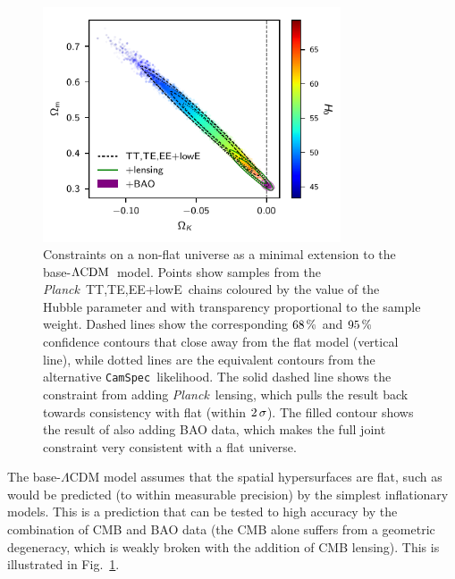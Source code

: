 \documentclass[longauth,traditabstract]{aa}
\def\Planck{\textit{Planck}}
\def\,{\thinspace}
\newcommand{\camspec}{{\tt CamSpec}}
\newcommand{\mksym}[1]{\ifmmode {\rm #1}\else #1\fi}
\newcommand{\dataplus}{\allowbreak+}
\newcommand{\TTTEEE}{\mksym{TT,TE,EE}}
\newcommand{\planckTTTEEEonly}{\planck\ \TTTEEE}
\newcommand{\lowE}{\mksym{lowE}}
\newcommand{\planckall}{\planckTTTEEEonly\dataplus\lowE}
\newcommand{\lcdm}{\texorpdfstring{{$\rm{\Lambda CDM}$}}{ΛCDM}}
\newcommand{\planck}{\Planck}
\begin{document}
\begin{figure}[t]
\centering
\includegraphics[width=88mm]{omegak-omegam.pdf}
\caption {
Constraints on a non-flat universe as a minimal extension to the base-\lcdm\ model.
Points show samples from the \planckall\ chains coloured by the value of the Hubble parameter and with transparency proportional to the sample weight.
Dashed lines show the corresponding $68\,\%$ and $95\,\%$ confidence contours that close away from the flat model (vertical line), while
dotted lines are the equivalent contours from the alternative \camspec\ likelihood.
The solid dashed line shows the constraint from adding \planck\ lensing, which pulls the result back towards consistency with flat (within $2\,\sigma$). The filled contour shows the result of also adding BAO data, which makes the full joint constraint very consistent with a flat universe.
\label{fig:omegak_omegam}
}
\end{figure}

The base-$\Lambda$CDM model assumes that the spatial hypersurfaces are flat,
such as would be predicted (to within measurable precision) by the simplest inflationary models.
This is a prediction that can be tested to high accuracy by the combination
of CMB and BAO data (the CMB alone suffers from a geometric degeneracy, which is
weakly broken with the addition of CMB lensing). This is illustrated in Fig.~\ref{fig:omegak_omegam}.
\end{document}
